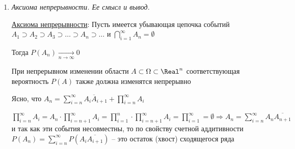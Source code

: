 \begin{enumerate}
\begin{enumerate}
        \item Если $A_1, A_2, \dots, A_n, \dots \in \mathcal{F}$ -- несовместное, то $P(\sum_{i = 1}^\infty A_i) = \sum_{i = 1}^\infty P(A_i)$ (свойство счетной аддитивности)

        \item $P(\Omega) = 1$ (условие нормированности)
    \end{enumerate}

    \hyperlink{probabilityspace}{Вероятностное пространство}: Вероятностное пространство -- тройка $(\Omega, \mathcal{F}, P)$

    \hyperlink{probabilityproperties}{Свойства вероятности}: 

    \begin{enumerate}
        \item Так как $\emptyset$ и $\Omega$ -- несовместные, то $1 = P(\Omega) = P(\Omega + \emptyset) = 1 + P(\emptyset) \Longrightarrow P(\emptyset) = 0$

        \item Формула обратной вероятности: $P(A) = 1 - P(\overline{A})$

        \item $P(A) = 1 - P(\overline{A}) \leq 1$
    \end{enumerate}

    \item \textit{Аксиома непрерывности. Ее смысл и вывод.}

    \hyperlink{continuityaxiom}{Аксиома непрерывности}: \Ths Пусть имеется убывающая цепочка событий $A_1 \supset A_2 \supset A_3 \supset \dots \supset A_n \supset \dots$ и $\bigcap_{i = 1}^\infty A_n = \emptyset$

    Тогда $P(A_n) \underset{n \to \infty}{\to} 0$

    При непрерывном изменении области $A \subset \Omega \subset \Real^n$ соответствующая вероятность $P(A)$ также должна изменятся непрерывно

    \begin{MyProof}
        Ясно, что $A_n = \sum_{i = n}^\infty A_i \overline{A}_{i + 1} + \prod_{i = n}^\infty A_i$

        $\prod_{i = n}^\infty A_i = A_n \cdot \prod_{i = n + 1}^\infty A_i = \prod_{i = 1}^n
        \cdot \prod_{i = n + 1}^\infty A_i = \prod_{i = 1}^\infty = \emptyset \Longrightarrow
        A_n = \sum_{i = n}^\infty A_n \overline{A_{n + 1}}$ и так как эти события несовместны,
        то по свойству счетной аддитивности $P(A_n) = \sum_{i = n}^\infty P(A_i \overline{A_{i + 1}})$ -- это остаток (хвост) сходящегося ряда


\end{MyProof}
\end{enumerate}
